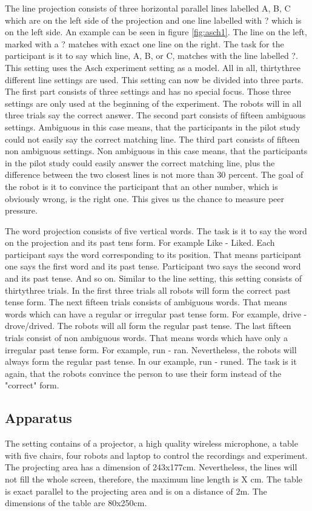 \documentclass{acm_proc_article-sp}
\begin{document}
The line projection consists of three horizontal parallel lines labelled A, B, C which are on the left side of the projection and one line labelled with ? which is on the left side. An example can be seen in figure \ref{fig:asch1}. The line on the left, marked with a ? matches with exact one line on the right. The task for the participant is it to say which line, A, B, or C, matches with the line labelled ?. This setting uses the Asch experiment setting as a model. All in all, thirtythree different line settings are used. This setting can now be divided into three parts. The first part consists of three settings and has no special focus. Those three settings are only used at the beginning of the experiment. The robots will in all three trials say the correct answer. The second part consists of fifteen ambiguous settings. Ambiguous in this case means, that the participants in the pilot study could not easily say the correct matching line. The third part consists of fifteen non ambiguous settings. Non ambiguous in this case means, that the participants in the pilot study could easily answer the correct matching line, plus the difference between the two closest lines is not more than 30 percent. The goal of the robot is it to convince the participant that an other number, which is obviously wrong, is the right one. This gives us the chance to measure peer pressure.   



The word projection consists of five vertical words. The task is it to say the word on the projection and its past tens form. For example Like - Liked. Each participant says the word corresponding to its position. That means participant one says the first word and its past tense. Participant two says the second word and its past tense. And so on. Similar to the line setting, this setting consists of thirtythree trials. In the first three trials all robots will form the correct past tense form. The next fifteen trials consists of ambiguous words. That means words which can have a regular or irregular past tense form. For example, drive - drove/drived. The robots will all form the regular past tense. The last fifteen trials consist of non ambiguous words. That means words which have only a irregular past tense form. For example, run - ran. Nevertheless, the robots will always form the regular past tense. In our example, run - runed. The task is it again, that the robots convince the person to use their form instead of the "correct" form.   


\subsection{Apparatus}
The setting contains of a projector, a high quality wireless microphone, a table with five chairs, four robots and laptop to control the recordings and experiment. The projecting area has a dimension of 243x177cm. Nevertheless, the lines will not fill the whole screen, therefore, the maximum line length is  X cm. The table is exact parallel to the projecting area and is on a distance of 2m. The dimensions of the table are 80x250cm.
\end{document}
